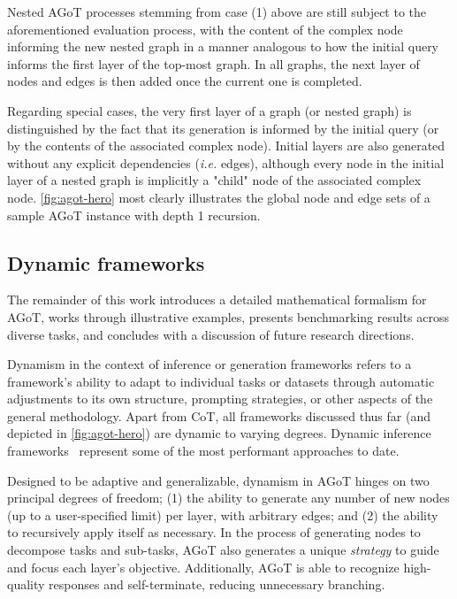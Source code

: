 \documentclass{article}
\begin{document}
Nested AGoT processes stemming from case (1) above are still subject to the aforementioned evaluation process, with the content of the complex node informing the new nested graph in a manner analogous to how the initial query informs the first layer of the top-most graph. In all graphs, the next layer of nodes and edges is then added once the current one is completed.

Regarding special cases, the very first layer of a graph (or nested graph) is distinguished by the fact that its generation is informed by the initial query (or by the contents of the associated complex node). Initial layers are also generated without any explicit dependencies (\textit{i.e.} edges), although every node in the initial layer of a nested graph is implicitly a "child" node of the associated complex node. \autoref{fig:agot-hero} most clearly illustrates the global node and edge sets of a sample AGoT instance with depth 1 recursion.

\subsection{Dynamic frameworks}





The remainder of this work introduces a detailed mathematical formalism for AGoT, works through illustrative examples, presents benchmarking results across diverse tasks, and concludes with a discussion of future research directions.



Dynamism in the context of inference or generation frameworks refers to a framework's ability to adapt to individual tasks or datasets through automatic adjustments to its own structure, prompting strategies, or other aspects of the general methodology. Apart from CoT, all frameworks discussed thus far (and depicted in \autoref{fig:agot-hero}) are dynamic to varying degrees. Dynamic inference frameworks~\citep{prasad2024adaptasneededdecompositionplanning, ning2024dgotdynamicgraphthoughts, zhu2024redeltoolkitllmpoweredrecursive, radha2024iterationthoughtleveraginginner} represent some of the most performant approaches to date.

Designed to be adaptive and generalizable, dynamism in AGoT hinges on two principal degrees of freedom; (1) the ability to generate any number of new nodes (up to a user-specified limit) per layer, with arbitrary edges; and (2) the ability to recursively apply itself as necessary. In the process of generating nodes to decompose tasks and sub-tasks, AGoT also generates a unique \textit{strategy} to guide and focus each layer's objective. Additionally, AGoT is able to recognize high-quality responses and self-terminate, reducing unnecessary branching.
\end{document}
